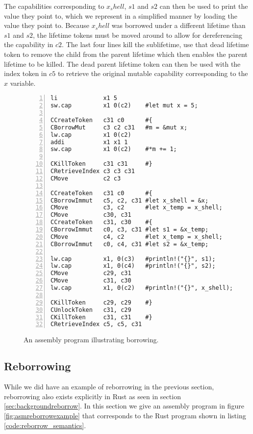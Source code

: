 The capabilities corresponding to $x_shell$, $s1$ and $s2$ can then be used to print the value they point to, which we represent in a simplified manner by loading the value they point to.
Because $x_shell$ was borrowed under a different lifetime than $s1$ and $s2$, the lifetime tokens must be moved around to allow for dereferencing the capability in $c2$.
The last four lines kill the sublifetime, use that dead lifetime token to remove the child from the parent lifetime which then enables the parent lifetime to be killed.
The dead parent lifetime token can then be used with the index token in $c5$ to retrieve the original mutable capability corresponding to the $x$ variable.

\begin{figure}[h]
\begin{lstlisting}[style=custASM, numbers = left ,xleftmargin=1.5em]
li             x1 5
sw.cap         x1 0(c2)    #let mut x = 5;

CCreateToken   c31 c0      #{
CBorrowMut     c3 c2 c31   #m = &mut x;
lw.cap         x1 0(c2)
addi           x1 x1 1
sw.cap         x1 0(c2)    #*m += 1;

CKillToken     c31 c31     #}
CRetrieveIndex c3 c3 c31
CMove          c2 c3

CCreateToken   c31 c0      #{
CBorrowImmut   c5, c2, c31 #let x_shell = &x;
CMove          c3, c2      #let x_temp = x_shell;
CMove          c30, c31
CCreateToken   c31, c30    #{
CBorrowImmut   c0, c3, c31 #let s1 = &x_temp;
CMove          c4, c2      #let x_temp = x_shell;
CBorrowImmut   c0, c4, c31 #let s2 = &x_temp;

lw.cap         x1, 0(c3)   #println!("{}", s1);
lw.cap         x1, 0(c4)   #println!("{}", s2);
CMove          c29, c31
CMove          c31, c30
lw.cap         x1, 0(c2)   #println!("{}", x_shell);

CKillToken     c29, c29    #}
CUnlockToken   c31, c29
CKillToken     c31, c31    #}
CRetrieveIndex c5, c5, c31
\end{lstlisting}
\caption{An assembly program illustrating borrowing.}
\label{fig:asmborrowexample}
\end{figure}

\subsection{Reborrowing}
While we did have an example of reborrowing in the previous section, reborrowing also exists explicitly in Rust as seen in section \ref{sec:backgroundreborrow}.
In this section we give an assembly program in figure \ref{fig:asmreborrowexample} that corresponds to the Rust program shown in listing \ref{code:reborrow_semantics}.

